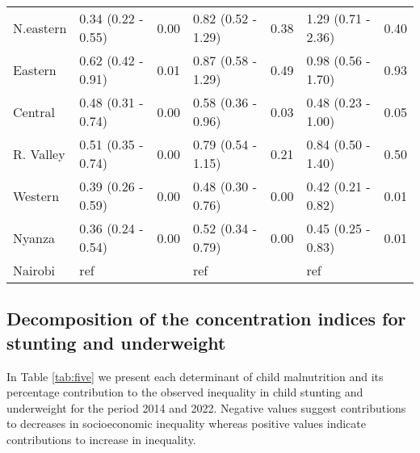 \documentclass[sn-basic,Numbered,pdflatex]{sn-jnl}
\theoremstyle{remark}
\theoremstyle{definition}
\begin{document}
\begin{table}[!h]
\begin{tabular}[t]{lllllll}
\hspace{1em}N.eastern & 0.34 (0.22 - 0.55) & 0.00 & 0.82 (0.52 - 1.29) & 0.38 & 1.29 (0.71 - 2.36) & 0.40\\
\addlinespace
\hspace{1em}Eastern & 0.62 (0.42 - 0.91) & 0.01 & 0.87 (0.58 - 1.29) & 0.49 & 0.98 (0.56 - 1.70) & 0.93\\
\hspace{1em}Central & 0.48 (0.31 - 0.74) & 0.00 & 0.58 (0.36 - 0.96) & 0.03 & 0.48 (0.23 - 1.00) & 0.05\\
\hspace{1em}R. Valley & 0.51 (0.35 - 0.74) & 0.00 & 0.79 (0.54 - 1.15) & 0.21 & 0.84 (0.50 - 1.40) & 0.50\\
\hspace{1em}Western & 0.39 (0.26 - 0.59) & 0.00 & 0.48 (0.30 - 0.76) & 0.00 & 0.42 (0.21 - 0.82) & 0.01\\
\hspace{1em}Nyanza & 0.36 (0.24 - 0.54) & 0.00 & 0.52 (0.34 - 0.79) & 0.00 & 0.45 (0.25 - 0.83) & 0.01\\
\addlinespace
\hspace{1em}Nairobi & ref &  & ref &  & ref & \\
\bottomrule
\end{tabular}
\end{table}
\renewcommand{\arraystretch}{1}

\hypertarget{decomposition-of-the-concentration-indices-for-stunting-and-underweight}{%
\subsection{Decomposition of the concentration indices for stunting and
underweight}\label{decomposition-of-the-concentration-indices-for-stunting-and-underweight}}

In Table \ref{tab:five} we present each determinant of child
malnutrition and its percentage contribution to the observed inequality
in child stunting and underweight for the period 2014 and 2022. Negative
values suggest contributions to decreases in socioeconomic inequality
whereas positive values indicate contributions to increase in
inequality.
\end{document}
